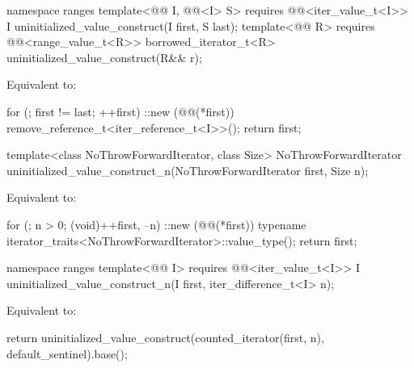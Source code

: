 %
\begin{itemdecl}
namespace ranges {
  template<@@ I, @@<I> S>
    requires @@<iter_value_t<I>>
    I uninitialized_value_construct(I first, S last);
  template<@@ R>
    requires @@<range_value_t<R>>
    borrowed_iterator_t<R> uninitialized_value_construct(R&& r);
}
\end{itemdecl}

\begin{itemdescr}
\pnum
\effects
Equivalent to:
\begin{codeblock}
for (; first != last; ++first)
  ::new (@@(*first)) remove_reference_t<iter_reference_t<I>>();
return first;
\end{codeblock}
\end{itemdescr}

%
\begin{itemdecl}
template<class NoThrowForwardIterator, class Size>
  NoThrowForwardIterator uninitialized_value_construct_n(NoThrowForwardIterator first, Size n);
\end{itemdecl}

\begin{itemdescr}
\pnum
\effects
Equivalent to:
\begin{codeblock}
for (; n > 0; (void)++first, --n)
  ::new (@@(*first))
    typename iterator_traits<NoThrowForwardIterator>::value_type();
return first;
\end{codeblock}
\end{itemdescr}

%
\begin{itemdecl}
namespace ranges {
  template<@@ I>
    requires @@<iter_value_t<I>>
    I uninitialized_value_construct_n(I first, iter_difference_t<I> n);
}
\end{itemdecl}

\begin{itemdescr}
\pnum
\effects
Equivalent to:
\begin{codeblock}
return uninitialized_value_construct(counted_iterator(first, n),
                                     default_sentinel).base();
\end{codeblock}
\end{itemdescr}

